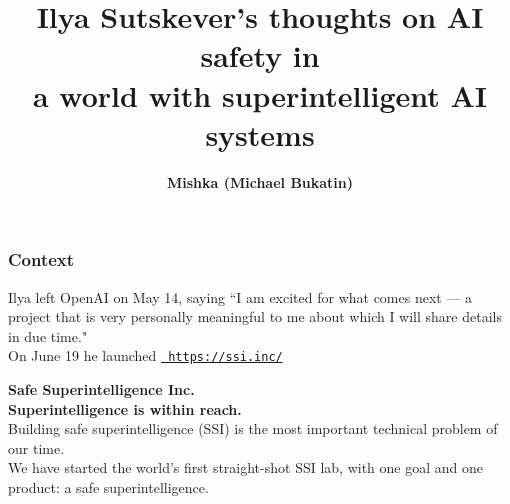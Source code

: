 \documentclass{beamer}
\newenvironment{customquote}
  {\begin{adjustwidth}{2em}{2em}\noindent\textnormal}
  {\end{adjustwidth}}
\newcommand{\msblue}[1]{{\color{myblue} #1}}
\newcommand{\msmagenta}[1]{{\color{mymagenta} #1}}
\begin{document}
\title{Ilya Sutskever's thoughts on AI safety in\\ a world with superintelligent AI systems}
\author{\msmagenta{\bf Mishka (Michael Bukatin)}}


\begin{frame}
  \titlepage
\end{frame}

\begin{frame}

  \frametitle{Context}

Ilya left OpenAI on May 14, saying ``I am excited for what comes next — a project that is very personally meaningful to me about which I will share details in due time."\\[2ex]

On June 19 he launched \href{https://ssi.inc/}{\tt \msblue{https://ssi.inc/}}\\[2ex]

\begin{customquote}
{\large\bf Safe Superintelligence Inc.}\\[1ex]

{\bf Superintelligence is within reach.}\\[1ex]

Building safe superintelligence (SSI) is the most important technical problem of our time.\\[1ex]

We have started the world’s first straight-shot SSI lab, with one goal and one product: a safe superintelligence.
\end{customquote}

\end{frame}
\end{document}
